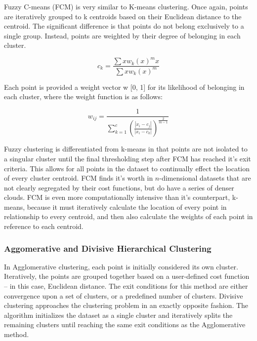 \documentclass[12pt]{drexelthesis}
\let\Oldsubsubsection\subsubsection
\renewcommand{\subsubsection}{\FloatBarrier\Oldsubsubsection}
\begin{document}
Fuzzy C-means (FCM) is very similar to K-means clustering. Once again, points are iteratively grouped to k centroids based on their Euclidean distance to the centroid. The significant difference is that points do not belong exclusively to a single group. Instead, points are weighted by their degree of belonging in each cluster.

\begin{equation}
	c_{k} = \frac{\sum{x}w_{k}(x)^{m}x}{\sum{x}w_{k}(x)^{m}}
\end{equation}

Each point is provided a weight vector w [0, 1] for its likelihood of belonging in each cluster, where the weight function is as follows:

\begin{equation}
	w_{ij} = \frac{1}{\sum_{k=1}^{c}(\frac{|x_{i}-c_{j}|}{|x_{i}-c_{k}|})^{\frac{2}{m-1}}}
\end{equation}

Fuzzy clustering is differentiated from k-means in that points are not isolated to a singular cluster until the final thresholding step after FCM has reached it's exit criteria. This allows for all points in the dataset to continually effect the location of every cluster centroid. FCM finds it's worth in $n$-dimensional datasets that are not clearly segregated by their cost functions, but do have a series of denser clouds. FCM is even more computationally intensive than it's counterpart, k-means, because it must iteratively calculate the location of every point in relationship to every centroid, and then also calculate the weights of each point in reference to each centroid.

\subsubsection{Aggomerative and Divisive Hierarchical Clustering}
In Agglomerative clustering, each point is initially considered its own cluster. Iteratively, the points are grouped together based on a user-defined cost function – in this case, Euclidean distance. The exit conditions for this method are either convergence upon a set of clusters, or a predefined number of clusters.
Divisive clustering approaches the clustering problem in an exactly opposite fashion. The algorithm initializes the dataset as a single cluster and iteratively splits the remaining clusters until reaching the same exit conditions as the Agglomerative method.
\end{document}
